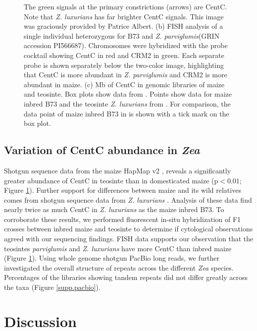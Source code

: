 \begin{figure}
{The green signals at the primary constrictions (arrows) are CentC.
Note that \emph{Z. luxurians} has far brighter CentC signals.
This image was graciously provided by Patrice Albert.
(b) FISH analysis of a single individual heterozygous for B73 and \emph{Z. parviglumis}(GRIN accession PI566687).
Chromosomes were hybridized with the \citet{Shi2010} probe cocktail showing CentC in red and CRM2 in green. 
Each separate probe is shown separately below the two-color image, highlighting that CentC is more abundant in \emph{Z. parviglumis} and CRM2 is more abundant in maize. 
(c)  Mb of CentC in genomic libraries of maize and teosinte. 
Box plots show data from \citet{Chia2012}. 
Points show data for maize inbred B73 and the teosinte \emph{Z. luxurians} from \citet{Tenaillon2011}. For comparison, the data point of maize inbred B73 in \citet{Chia2012} is shown with a tick mark on the box plot.
}
\label{abundance}    
\end{figure}

\subsection*{Variation of CentC abundance in \emph{Zea}}

Shotgun sequence data from the maize HapMap v2 \citep{Chia2012}, reveals a significantly greater abundance of CentC in teosinte than in domesticated maize (p$<0.01$; Figure \ref{abundance}).   
Further support for differences between maize and its wild relatives comes from shotgun sequence data from \emph{Z. luxurians} \citep{Tenaillon2011}.  
Analysis of these data find nearly twice as much CentC in \emph{Z. luxurians} as the maize inbred B73.  
To corroborate these results, we performed fluorescent in-situ hybridization of F1 crosses between inbred maize and teosinte to determine if cytological observations agreed with our sequencing findings.   
FISH data supports our observation that the teosintes \emph{parviglumis} and \emph{Z. luxurians} have more CentC than inbred maize (Figure \ref{abundance}).
Using whole genome shotgun PacBio long reads, we further investigated the overall structure of repeats across the different \emph{Zea} species.
Percentages of the libraries showing tandem repeats did not differ greatly across the taxa (Figure \ref{supp.pacbio}).

\section*{Discussion}
\label{discussion}

